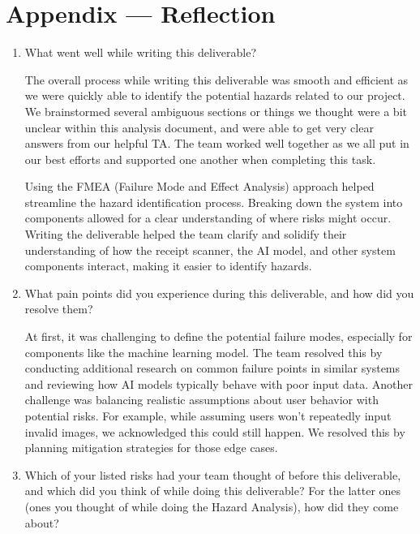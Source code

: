 \documentclass{article}
\begin{document}

\newpage{}

\section*{Appendix --- Reflection}



\begin{enumerate}

\item What went well while writing this deliverable?

The overall process while writing this deliverable was smooth and efficient as we were quickly able to identify the potential hazards related to our project. We brainstormed several ambiguous sections or things we thought were a bit unclear within this analysis document, and were able to get very clear answers from our helpful TA. The team worked well together as we all put in our best efforts and supported one another when completing this task. 

Using the FMEA (Failure Mode and Effect Analysis) approach helped streamline the hazard identification process. Breaking down the system into components allowed for a clear understanding of where risks might occur. Writing the deliverable helped the team clarify and solidify their understanding of how the receipt scanner, the AI model, and other system components interact, making it easier to identify hazards.

\item What pain points did you experience during this deliverable, and how did you resolve them?

At first, it was challenging to define the potential failure modes, especially for components like the machine learning model. The team resolved this by conducting additional research on common failure points in similar systems and reviewing how AI models typically behave with poor input data. Another challenge was balancing realistic assumptions about user behavior with potential risks. For example, while assuming users won’t repeatedly input invalid images, we acknowledged this could still happen. We resolved this by planning mitigation strategies for those edge cases.

\item Which of your listed risks had your team thought of before this deliverable, and which did you think of while doing this deliverable? For the latter ones (ones you thought of while doing the Hazard Analysis), how did they come about?


\end{enumerate}
\end{document}
